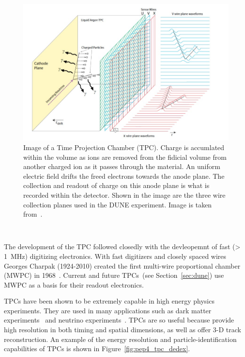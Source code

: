 \begin{figure}[]
\centering
\includegraphics[width=\textwidth]{images/dune_tdrv12020_lartpc-sp.jpg}
\caption{Image of a Time Projection Chamber (TPC).
Charge is accumlated within the volume as ions are removed from the fidicial volume from another charged ion as it passes through the material.
An uniform electric field drifts the freed electrons towards the anode plane.
The collection and readout of charge on this anode plane is what is recorded within the detector.
Shown in the image are the three wire collection planes used in the DUNE experiment.
Image is taken from~\citep{DUNE_TDR_V1_Abi_2020}.}
\end{figure}~\label{fig:dune_apa}

The development of the TPC followed closedly with the devleopemnt of fast (> 1~\unit{MHz}) digitizing electronics.
With fast digitizers and closely spaced wires Georges Charpak (1924-2010) created the first multi-wire proportional chamber (MWPC) in 1968~\citep{Charpak:1968kd}.
Current and future TPCs~(see Section~\ref{sec:dune}) use MWPC as a basis for their readout electronics.

TPCs have been shown to be extremely capable in high energy physics experiments.
They are used in many applications such as dark matter experiments~\citep{Aprile_2017_xenon1T} and neutrino experiments~\citep{MicroBooNE_Acciarri_2017}.
TPCs are so useful because provide high resolution in both timing and spatial dimensions, as well as offer 3-D track reconstruction.
An example of the energy resolution and particle-identification capabilities of TPCs is shown in Figure~\ref{fig:pep4_tpc_dedex}.

